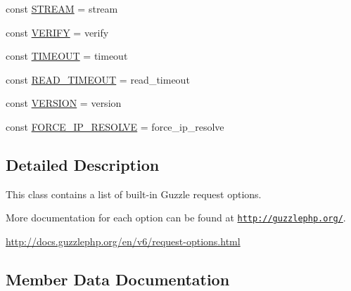 \begin{DoxyCompactItemize}
\item 
const \hyperlink{classGuzzleHttp_1_1RequestOptions_a7b6e1e5587ec5fe7cd7c41f53d84ad81}{S\+T\+R\+E\+AM} = \textquotesingle{}stream\textquotesingle{}
\item 
const \hyperlink{classGuzzleHttp_1_1RequestOptions_a7f085866a7fc8c0d6ed835d6225c697d}{V\+E\+R\+I\+FY} = \textquotesingle{}verify\textquotesingle{}
\item 
const \hyperlink{classGuzzleHttp_1_1RequestOptions_a444b9671807d0a4cda7a1c0fc9571d3b}{T\+I\+M\+E\+O\+UT} = \textquotesingle{}timeout\textquotesingle{}
\item 
const \hyperlink{classGuzzleHttp_1_1RequestOptions_ab30a410e803598d3ead7926232b9a2c4}{R\+E\+A\+D\+\_\+\+T\+I\+M\+E\+O\+UT} = \textquotesingle{}read\+\_\+timeout\textquotesingle{}
\item 
const \hyperlink{classGuzzleHttp_1_1RequestOptions_a507d60351967e5080faa7d1828effaa2}{V\+E\+R\+S\+I\+ON} = \textquotesingle{}version\textquotesingle{}
\item 
const \hyperlink{classGuzzleHttp_1_1RequestOptions_a04cdbf8ea0ffe4867a265681214d72b4}{F\+O\+R\+C\+E\+\_\+\+I\+P\+\_\+\+R\+E\+S\+O\+L\+VE} = \textquotesingle{}force\+\_\+ip\+\_\+resolve\textquotesingle{}
\end{DoxyCompactItemize}


\subsection{Detailed Description}
This class contains a list of built-\/in Guzzle request options.

More documentation for each option can be found at \href{http://guzzlephp.org/}{\tt http\+://guzzlephp.\+org/}.

\hyperlink{}{http\+://docs.\+guzzlephp.\+org/en/v6/request-\/options.\+html}

\subsection{Member Data Documentation}
\mbox{\label{classGuzzleHttp_1_1RequestOptions_a4adbc55b965409eb5d798d4898e6865f}} 

